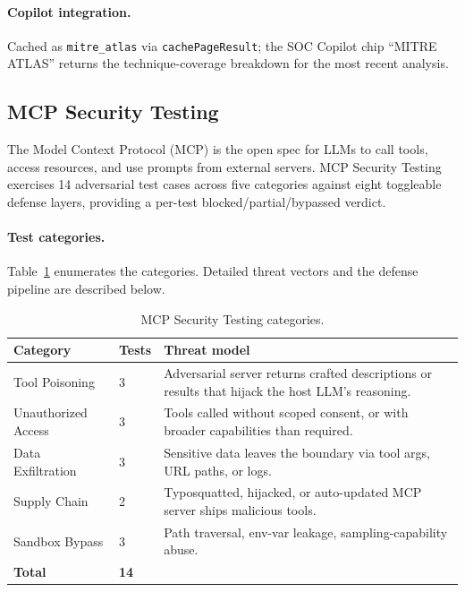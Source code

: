 \documentclass[11pt,a4paper]{article}
\begin{document}
\paragraph{Copilot integration.} Cached as \texttt{mitre\_atlas} via
\texttt{cachePageResult}; the SOC Copilot chip ``MITRE ATLAS'' returns
the technique-coverage breakdown for the most recent analysis.

\subsection{MCP Security Testing}
\label{sec:mcp_security}

The Model Context Protocol (MCP) is the open spec for LLMs to call
tools, access resources, and use prompts from external servers.
MCP Security Testing exercises 14 adversarial test cases across five
categories against eight toggleable defense layers, providing a
per-test blocked/partial/bypassed verdict.

\paragraph{Test categories.}
Table~\ref{tab:mcp_categories} enumerates the categories.  Detailed
threat vectors and the defense pipeline are described below.

\begin{table}[H]
\centering
\caption{MCP Security Testing categories.}
\label{tab:mcp_categories}
\small
\begin{tabular}{@{}llp{8.5cm}@{}}
\toprule
\textbf{Category} & \textbf{Tests} & \textbf{Threat model} \\
\midrule
Tool Poisoning         & 3 & Adversarial server returns crafted descriptions or results that hijack the host LLM's reasoning. \\
Unauthorized Access    & 3 & Tools called without scoped consent, or with broader capabilities than required. \\
Data Exfiltration      & 3 & Sensitive data leaves the boundary via tool args, URL paths, or logs. \\
Supply Chain           & 2 & Typosquatted, hijacked, or auto-updated MCP server ships malicious tools. \\
Sandbox Bypass         & 3 & Path traversal, env-var leakage, sampling-capability abuse. \\
\midrule
\textbf{Total} & \textbf{14} & \\
\bottomrule
\end{tabular}
\end{table}
\end{document}

